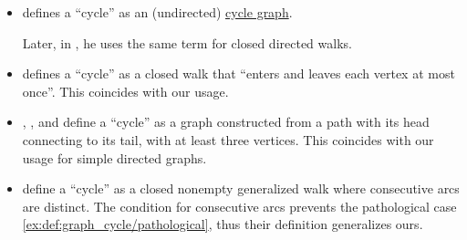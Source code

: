 \begin{remark}
\begin{thmenum}
\begin{itemize}
      \item \Textcite[example 10.2.6]{Rosen2019DiscreteMathematics} defines a \enquote{cycle} as an (undirected) \hyperref[def:cycle_graph]{cycle graph}.

      Later, in \cite[def. 10.4.2]{Rosen2019DiscreteMathematics}, he uses the same term for closed directed walks.

      \item \Textcite[191]{Erickson2019Algorithms} defines a \enquote{cycle} as a closed walk that \enquote{enters and leaves each vertex at most once}. This coincides with our usage.

      \item \Textcite[13]{Harary1969GraphTheory}, \textcite[8]{Diestel2017GraphTheory}, \textcite[5]{Bollobás1998ModernGraphTheory} and \textcite[377]{Knuth1997ArtVol1} define a \enquote{cycle} as a graph constructed from a path with its head connecting to its tail, with at least three vertices. This coincides with our usage for simple directed graphs.

      \item \Textcite[13]{GondranMinoux1984GraphsAndAlgorithms} define a \enquote{cycle} as a closed nonempty generalized walk where consecutive arcs are distinct. The condition for consecutive arcs prevents the pathological case \cref{ex:def:graph_cycle/pathological}, thus their definition generalizes ours.
    \end{itemize}
  \end{thmenum}
\end{remark}


